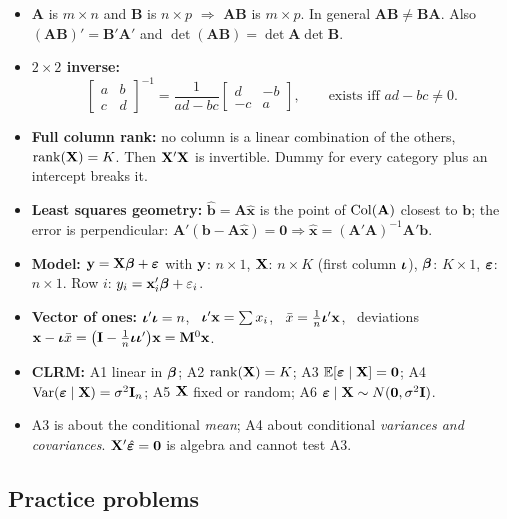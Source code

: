 \documentclass[11pt]{article}
\begin{document}
\begin{keybox}
\begin{itemize}
  \item $\mathbf{A}$ is $m\times n$ and $\mathbf{B}$ is $n\times p$ $\Rightarrow$ $\mathbf{AB}$ is $m\times p$. In general $\mathbf{AB}\neq\mathbf{BA}$. Also $(\mathbf{AB})'=\mathbf{B}'\mathbf{A}'$ and $\det(\mathbf{AB})=\det\mathbf{A}\det\mathbf{B}$.
  \item \textbf{$2\times2$ inverse:}
  \[ \begin{bmatrix} a & b\\ c & d\end{bmatrix}^{-1}=\frac{1}{ad-bc}\begin{bmatrix} d & -b\\ -c & a\end{bmatrix}, \qquad \text{exists iff } ad-bc\neq0. \]
  \item \textbf{Full column rank:} no column is a linear combination of the others, $\operatorname{rank}(\mathbf{X})=K$. Then $\mathbf{X}'\mathbf{X}$ is invertible. Dummy for every category plus an intercept breaks it.
  \item \textbf{Least squares geometry:} $\hat{\mathbf b}=\mathbf{A}\hat{\mathbf x}$ is the point of $\operatorname{Col}(\mathbf A)$ closest to $\mathbf b$; the error is perpendicular: $\mathbf{A}'(\mathbf b-\mathbf A\hat{\mathbf x})=\mathbf 0\Rightarrow\hat{\mathbf x}=(\mathbf A'\mathbf A)^{-1}\mathbf A'\mathbf b$.
  \item \textbf{Model:} $\mathbf{y}=\mathbf{X}\bm{\beta}+\bm{\varepsilon}$ with $\mathbf{y}$: $n\times1$, $\mathbf{X}$: $n\times K$ (first column $\bm{\iota}$), $\bm{\beta}$: $K\times1$, $\bm{\varepsilon}$: $n\times1$. Row $i$: $y_i=\mathbf x_i'\bm{\beta}+\varepsilon_i$.
  \item \textbf{Vector of ones:} $\bm{\iota}'\bm{\iota}=n$, \ $\bm{\iota}'\mathbf x=\sum x_i$, \ $\bar{x}=\tfrac1n\bm{\iota}'\mathbf x$, \ deviations $\mathbf x-\bm{\iota}\bar{x}=\big(\mathbf{I}-\tfrac1n\bm{\iota}\bm{\iota}'\big)\mathbf x=\mathbf{M}^0\mathbf x$.
  \item \textbf{CLRM:} A1 linear in $\bm{\beta}$; A2 $\operatorname{rank}(\mathbf{X})=K$; A3 $\mathbb{E}[\bm{\varepsilon}\mid\mathbf{X}]=\mathbf0$; A4 $\operatorname{Var}(\bm{\varepsilon}\mid\mathbf{X})=\sigma^2\mathbf{I}_n$; A5 $\mathbf{X}$ fixed or random; A6 $\bm{\varepsilon}\mid\mathbf{X}\sim N(\mathbf0,\sigma^2\mathbf{I})$.
  \item A3 is about the conditional \emph{mean}; A4 about conditional \emph{variances and covariances}. $\mathbf{X}'\hat{\bm{\varepsilon}}=\mathbf0$ is algebra and cannot test A3.
\end{itemize}
\end{keybox}

\subsection{Practice problems}
\setcounter{prob}{0}
\end{document}
